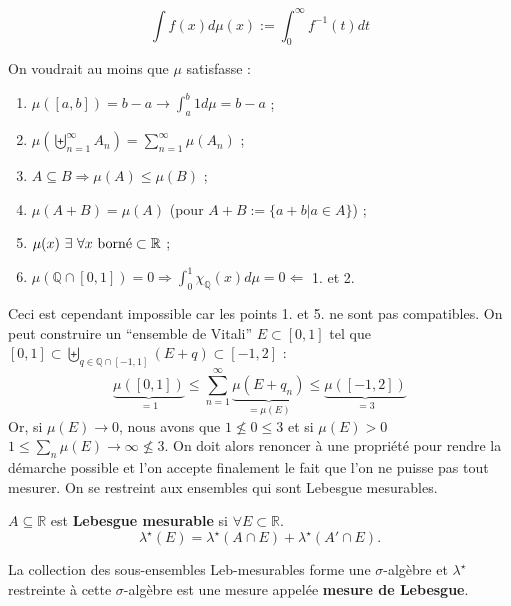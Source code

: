 \begin{definition}
    \begin{equation}
        \int f(x) d\mu(x) := \int_0^\infty f^{-1}(t) dt
    \end{equation}
\end{definition}

\noindent
On voudrait au moins que $\mu$ satisfasse :
\begin{enumerate}
    \item $\mu([a,b]) = b-a \rightarrow \int_a^b 1d\mu = b-a$ ;
    \item $\mu(\biguplus_{n=1}^\infty A_n) = \sum_{n=1}^\infty \mu(A_n)$ ;
    \item $A\subseteq B \Rightarrow \mu(A)\leq\mu(B)$ ;
    \item $\mu(A+B) = \mu(A)$ (pour $A+B := \{a+b|a\in A\}$) ;
    \item $\mu(x)\ \exists\ \forall x\ \mathrm{born\Acute{e}}\subset\mathbb{R}$ ;
    \item $\mu(\mathbb{Q}\cap[0,1]) = 0 \Rightarrow \int_0^1 \chi_\mathbb{Q}(x) d\mu = 0 \Leftarrow$ 1. et 2.
\end{enumerate}
Ceci est cependant impossible car les points 1. et 5. ne sont pas compatibles. On peut construire un ``ensemble de Vitali'' $E\subset[0,1]$ tel que $[0,1]\subset\biguplus_{q\in\mathbb{Q}\cap[-1,1]}(E+q)\subset [-1,2]$ :
\begin{equation*}
    \underbrace{\mu([0,1])}_{=1} \leq \sum_{n=1}^\infty \underbrace{\mu(E+q_n)}_{=\mu(E)} \leq \underbrace{\mu([-1,2])}_{=3}
\end{equation*}
Or, si $\mu(E)\to0$, nous avons que $1\nleq0\leq3$ et si $\mu(E)>0$ $1\leq \sum_n \mu(E)\to\infty\nleq3$. On doit alors renoncer à une propriété pour rendre la démarche possible et l'on accepte finalement le fait que l'on ne puisse pas tout mesurer. On se restreint aux ensembles qui sont Lebesgue mesurables.

\begin{definition}
    $A\subseteq\mathbb{R}$ est \textbf{Lebesgue mesurable} si $\forall E\subset\mathbb{R}$.
    \begin{equation}
        \lambda^\star(E) = \lambda^\star(A\cap E) + \lambda^\star(A'\cap E).
    \end{equation}
\end{definition}

\begin{remark}
    La collection des sous-ensembles Leb-mesurables forme une $\sigma$-algèbre et $\lambda^\star$ restreinte à cette $\sigma$-algèbre est une mesure appelée \textbf{mesure de Lebesgue}.
\end{remark}

